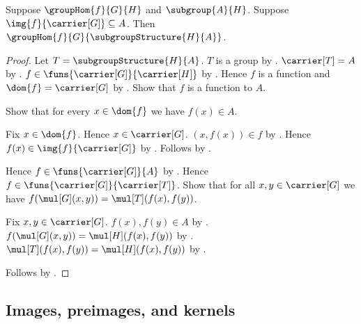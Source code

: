 \begin{theorem}\label{group_hom_codomain_corestriction}
    Suppose $\groupHom{f}{G}{H}$ and $\subgroup{A}{H}$.
    Suppose $\img{f}{\carrier[G]}\subseteq A$.
    Then
        $\groupHom{f}{G}{\subgroupStructure{H}{A}}$.
\end{theorem}
\begin{proof}
    Let $T=\subgroupStructure{H}{A}$.
    $T$ is a group by .
    $\carrier[T]=A$ by .
    $f\in\funs{\carrier[G]}{\carrier[H]}$ by
        .
    Hence $f$ is a function and $\dom{f}=\carrier[G]$ by
        .
    Show that $f$ is a function to $A$.
    \begin{subproof}
        Show that for every $x\in\dom{f}$ we have $f(x)\in A$.
        \begin{subproof}
            Fix $x\in\dom{f}$.
            Hence $x\in\carrier[G]$.
            $(x,f(x))\in f$ by .
            Hence $f(x)\in\img{f}{\carrier[G]}$ by
                .
            Follows by .
        \end{subproof}
    \end{subproof}
    Hence $f\in\funs{\carrier[G]}{A}$ by
        .
    Hence $f\in\funs{\carrier[G]}{\carrier[T]}$.
    Show that for all $x,y\in\carrier[G]$ we have
        $f(\mul[G](x,y))=\mul[T](f(x),f(y))$.
    \begin{subproof}
        Fix $x,y\in\carrier[G]$.
        $f(x),f(y)\in A$ by .
        $f(\mul[G](x,y))=\mul[H](f(x),f(y))$ by
            .
        $\mul[T](f(x),f(y))=\mul[H](f(x),f(y))$ by
            .
    \end{subproof}
    Follows by .
\end{proof}

\subsection{Images, preimages, and kernels}

